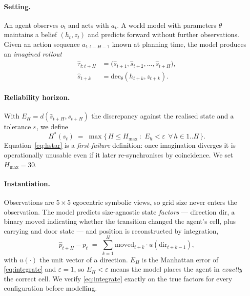 \documentclass[twocolumn,10pt]{article}
\newcommand{\Hstar}{H^{*}}
\begin{document}
\paragraph{Setting.}
An agent observes $o_t$ and acts with $a_t$. A world model with parameters $\theta$ maintains a
belief $(h_t, z_t)$ and predicts forward without further observations. Given an action sequence
$a_{t:t+H-1}$ known at planning time, the model produces an \emph{imagined rollout}
\begin{equation}
\begin{aligned}
\hat{\tau}_{t:t+H} &= \big(\hat{s}_{t+1}, \hat{s}_{t+2}, \dots, \hat{s}_{t+H}\big), \\
\hat{s}_{t+k} &= \mathrm{dec}_\theta(h_{t+k}, z_{t+k}).
\end{aligned}
\end{equation}

\paragraph{Reliability horizon.}
With $E_H = d(\hat{s}_{t+H}, s_{t+H})$ the discrepancy against the realised state and a
tolerance $\varepsilon$, we define
\begin{equation}
\Hstar(s_t) \;=\; \max\big\{\, H \le H_{\max} \;:\; E_h < \varepsilon \ \ \forall\, h \in 1..H \,\big\}.
\label{eq:hstar}
\end{equation}
Equation~\eqref{eq:hstar} is a \emph{first-failure} definition: once imagination diverges it is
operationally unusable even if it later re-synchronises by coincidence. We set
$H_{\max} = 30$.

\paragraph{Instantiation.}
Observations are $5\times5$ egocentric symbolic views, so grid size never enters the
observation. The model predicts size-agnostic state \emph{factors} --- direction $\mathrm{dir}$,
a binary $\mathrm{moved}$ indicating whether the transition changed the agent's cell, plus
carrying and door state --- and position is reconstructed by integration,
\begin{equation}
\hat{p}_{t+H} - p_t \;=\; \sum_{k=1}^{H} \mathrm{moved}_{t+k}\cdot u(\mathrm{dir}_{t+k-1}),
\label{eq:integrate}
\end{equation}
with $u(\cdot)$ the unit vector of a direction. $E_H$ is the Manhattan error of
\eqref{eq:integrate} and $\varepsilon = 1$, so $E_H < \varepsilon$ means the model places the
agent in \emph{exactly} the correct cell. We verify \eqref{eq:integrate} exactly on the true
factors for every configuration before modelling.
\end{document}
